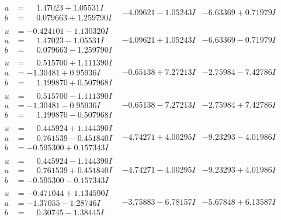 \documentclass[1p]{elsarticle_modified}
\theoremstyle{definition}
\begin{document}
$$\begin{array}{c|c|c}
\begin{aligned}
a &= \phantom{-}1.47023 + 1.05531 I \\
b &= \phantom{-}0.079663 + 1.259790 I\end{aligned}
 & -4.09621 - 1.05243 I & -6.63369 + 0.71979 I \\ \hline\begin{aligned}
u &= -0.424101 - 1.130320 I \\
a &= \phantom{-}1.47023 - 1.05531 I \\
b &= \phantom{-}0.079663 - 1.259790 I\end{aligned}
 & -4.09621 + 1.05243 I & -6.63369 - 0.71979 I \\ \hline\begin{aligned}
u &= \phantom{-}0.515700 + 1.111390 I \\
a &= -1.30481 + 0.95936 I \\
b &= \phantom{-}1.199870 + 0.507968 I\end{aligned}
 & -0.65138 + 7.27213 I & -2.75984 - 7.42786 I \\ \hline\begin{aligned}
u &= \phantom{-}0.515700 - 1.111390 I \\
a &= -1.30481 - 0.95936 I \\
b &= \phantom{-}1.199870 - 0.507968 I\end{aligned}
 & -0.65138 - 7.27213 I & -2.75984 + 7.42786 I \\ \hline\begin{aligned}
u &= \phantom{-}0.445924 + 1.144390 I \\
a &= \phantom{-}0.761539 - 0.451840 I \\
b &= -0.595300 + 0.157343 I\end{aligned}
 & -4.74271 + 4.00295 I & -9.23293 - 4.01986 I \\ \hline\begin{aligned}
u &= \phantom{-}0.445924 - 1.144390 I \\
a &= \phantom{-}0.761539 + 0.451840 I \\
b &= -0.595300 - 0.157343 I\end{aligned}
 & -4.74271 - 4.00295 I & -9.23293 + 4.01986 I \\ \hline\begin{aligned}
u &= -0.471044 + 1.134590 I \\
a &= -1.37055 - 1.28746 I \\
b &= \phantom{-}0.30745 - 1.38445 I\end{aligned}
 & -3.75883 - 6.78157 I & -5.67848 + 6.13587 I \\ \hline\begin{aligned}

\end{aligned}
\end{array}$$
\end{document}
